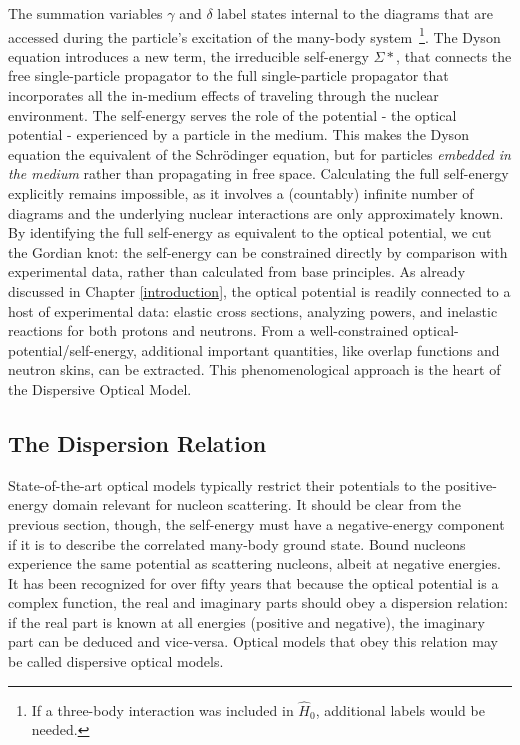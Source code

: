 The summation variables $\gamma$ and $\delta$ label states internal to the diagrams that are 
accessed during the particle's excitation of the many-body system\
\footnote{If a three-body interaction was included in $\hat{H}_{0}$, additional labels would be needed.}. The Dyson
equation introduces a new term, the irreducible self-energy $\Sigma*$, that connects the free
single-particle propagator to the full single-particle propagator that incorporates all the
in-medium effects of traveling through the nuclear environment. The self-energy serves the role
of the potential - the optical potential - experienced by a particle in the medium.
This makes the Dyson equation the
equivalent of the Schr\"odinger equation, but for particles \textit{embedded in the medium} 
rather than propagating in free space. Calculating the full self-energy explicitly remains
impossible, as it involves a (countably) infinite number of diagrams and the underlying nuclear
interactions are only approximately known. By identifying the full self-energy as equivalent
to the optical potential, we cut the Gordian knot: the self-energy can be constrained
directly by comparison with experimental data, rather than calculated from base
principles. As already discussed in Chapter \ref{introduction}, the optical potential is  
readily connected to a host of experimental data: elastic cross sections, analyzing powers, and 
inelastic reactions for both protons and neutrons.
From a well-constrained optical-potential/self-energy, additional important quantities, like
overlap functions and neutron skins, can be extracted. This phenomenological approach is the 
heart of the Dispersive Optical Model.

\subsection{The Dispersion Relation}
State-of-the-art optical models \cite{CH89, KoningDelaroche} typically restrict their potentials to the
positive-energy domain relevant for nucleon scattering. It should be clear from the previous
section, though, the self-energy must have a negative-energy component if it is to describe the
correlated many-body ground state. Bound nucleons experience the same potential as scattering nucleons, albeit at
negative energies. It has been recognized for over fifty years \cite{FeshbachDispersionRelation,
Passatore1967} that because the optical potential is a complex function, the real and imaginary
parts should obey a dispersion relation: if the real part is known at all energies (positive and
negative), the imaginary part can be deduced and vice-versa. Optical models that obey this relation
may be called dispersive optical models.

